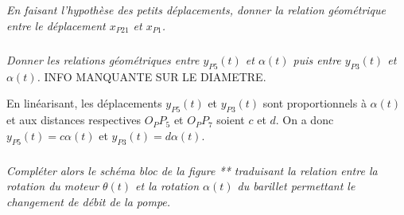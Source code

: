 \documentclass[10pt,fleqn]{article} %
\begin{document}
\begin{multicols}{2}
\subparagraph{}
\textit{En faisant l'hypothèse des petits déplacements, donner la relation géométrique entre le déplacement $x_{P21}$ et $x_{P1}$.}
\begin{corrige}

\end{corrige}

\subparagraph{}
\textit{Donner les relations géométriques entre $y_{P5}(t)$ et $\alpha(t)$ puis entre $y_{P3}(t)$ et $\alpha(t)$.}
INFO MANQUANTE SUR LE DIAMETRE.
\begin{corrige}
En linéarisant, les déplacements $y_{P5}(t)$ et $y_{P3}(t)$ sont proportionnels à $\alpha(t)$ et aux distances respectives $O_PP_5$ et $O_PP_7$ soient $c$ et $d$. 
On a donc $y_{P5}(t)=c\alpha(t)$ et $y_{P3}(t)=d \alpha(t)$.

\end{corrige}

\subparagraph{}
\textit{Compléter alors le schéma bloc de la figure ** traduisant la relation entre la rotation du moteur $\theta(t)$ et la rotation $\alpha(t)$ du barillet permettant le changement de débit de la pompe.}
\begin{corrige}

\end{corrige}


\end{multicols}

\begin{center}
\end{center}
\end{document}
